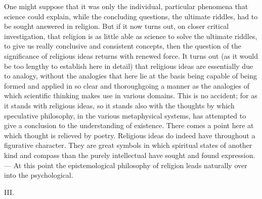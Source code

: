 \documentclass[12pt,a4paper]{article}
\newcommand{\snum}[1]{\bigskip\begin{center}#1\end{center}\nopagebreak\medskip}
\begin{document}
One might suppose that it was only the individual, particular phenomena that
science could explain, while the concluding questions, the ultimate riddles,
had to be sought answered in religion. But if it now turns out, on closer
critical investigation, that religion is as little able as science to solve the
ultimate riddles, to give us really conclusive and consistent concepts, then
the question of the significance of religious ideas returns with renewed force.
It turns out (as it would be too lengthy to establish here in detail) that
religious ideas are essentially due to analogy, without the analogies that here
lie at the basis being capable of being formed and applied in so clear and
thoroughgoing a manner as the analogies of which scientific thinking makes use
in various domains. This is no accident; for as it stands with religious
ideas, so it stands also with the thoughts by which speculative philosophy, in
the various metaphysical systems, has attempted to give a conclusion to the
understanding of existence. There comes a point here at which thought is
relieved by poetry. Religious ideas do indeed have throughout a figurative
character. They are great symbols in which spiritual states of another kind and
compass than the purely intellectual have sought and found expression. --- At
this point the epistemological philosophy of religion leads naturally over into
the psychological.

\snum{III.}
\end{document}
